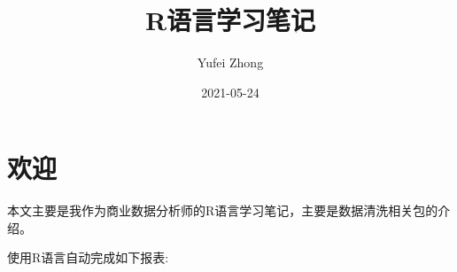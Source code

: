 \documentclass[
]{book}
\title{R语言学习笔记}
\author{Yufei Zhong}
\date{2021-05-24}
\begin{document}
\maketitle

{
\setcounter{tocdepth}{1}
\tableofcontents
}
\hypertarget{welcome}{%
\chapter*{欢迎}\label{welcome}}

本文主要是我作为商业数据分析师的R语言学习笔记，主要是数据清洗相关包的介绍。

使用R语言自动完成如下报表:

\providecommand{\docline}[3]{\noalign{\global\setlength{\arrayrulewidth}{#1}}\arrayrulecolor[HTML]{#2}\cline{#3}}

\setlength{\tabcolsep}{2pt}

\renewcommand*{\arraystretch}{1.5}
\end{document}
